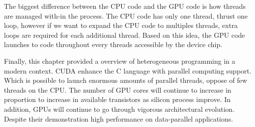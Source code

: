 The biggest difference between the CPU code and the GPU code is how threads are managed with-in the process. The CPU code has only one thread, thrust one loop, however if we want to expand the CPU code to multiples threads, extra loops are required for each additional thread. Based on this idea, the GPU code launches to code throughout every threads accessible by the device chip. 

\vspace{3.2em}

Finally, this chapter provided a overview of heterogeneous programming in a modern context. CUDA  enhance the C language with parallel computing support. Which is possible to launch  enormous amounts of parallel threads, oppose of few threads on the CPU. The number of GPU cores will continue to increase in proportion to increase in available transistors as silicon process improve. In addition, GPUs will continue to go through vigorous architectural evolution. Despite their demonstration high performance on data-parallel applications. \cite{hwu}








